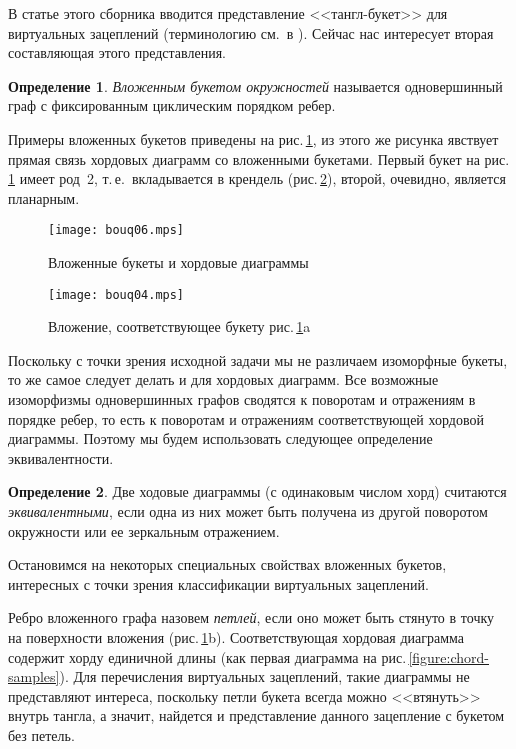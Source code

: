 \documentclass[a4paper,12pt]{article}
\def\figureref#1{рис.\,\protect\ref{#1}}
\let\picref=\figureref
\theoremstyle{plain}
\theoremstyle{definition}
\newtheorem{definition}{Определение}
\begin{document}
В статье \cite{We_Tangles2010} этого сборника вводится представление <<тангл-букет>> для виртуальных зацеплений (терминологию
см.~в \cite{We_Tangles2010}). Сейчас нас интересует вторая составляющая этого представления.
\begin{definition}
\textit{Вложенным букетом окружностей} называется одновершинный граф с фиксированным циклическим порядком ребер.
\end{definition}
Примеры вложенных букетов приведены на \picref{figure:bouquet-CD}, из этого же рисунка явствует прямая связь хордовых диаграмм
со вложенными букетами. Первый букет на \picref{figure:bouquet-CD} имеет род~2, т.\,е.~вкладывается в крендель
(\picref{figure:genus2}), второй, очевидно, является планарным.
\begin{figure}[ht]
\centering
\texttt{[image: bouq06.mps]}
\caption{\footnotesize Вложенные букеты и хордовые диаграммы\label{figure:bouquet-CD}}
\end{figure}
\begin{figure}[ht]
\centering
\texttt{[image: bouq04.mps]}
\caption{\footnotesize Вложение, соответствующее букету \picref{figure:bouquet-CD}a\label{figure:genus2}}
\end{figure}
Поскольку с точки зрения исходной задачи мы не различаем изоморфные букеты, то же самое следует делать и для хордовых диаграмм.
Все возможные изоморфизмы одновершинных графов сводятся к поворотам и отражениям в порядке ребер, то есть к поворотам и
отражениям соответствующей хордовой диаграммы. Поэтому мы будем использовать следующее определение эквивалентности.
\begin{definition}
Две ходовые диаграммы (с одинаковым числом хорд) считаются \textit{эквивалентными}, если одна из них может быть получена из
другой поворотом окружности или ее зеркальным отражением.
\end{definition}

Остановимся на некоторых специальных свойствах вложенных букетов, интересных с точки зрения классификации виртуальных
зацеплений.

Ребро вложенного графа назовем \textit{петлей}, если оно может быть стянуто в точку на поверхности вложения
(\picref{figure:bouquet-CD}b). Соответствующая хордовая диаграмма содержит хорду единичной длины (как первая диаграмма на
\picref{figure:chord-samples}). Для перечисления виртуальных зацеплений, такие диаграммы не представляют интереса, поскольку
петли букета всегда можно <<втянуть>> внутрь тангла, а значит, найдется и представление данного зацепление с букетом без
петель.
\end{document}
